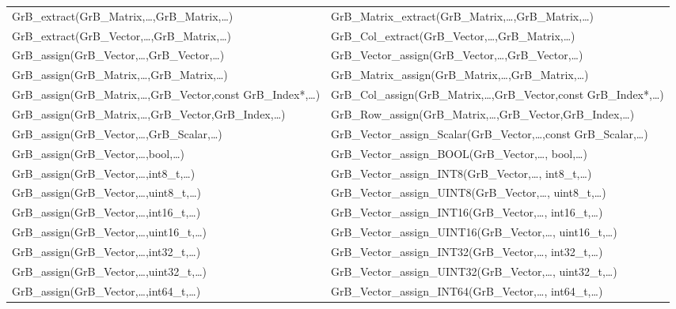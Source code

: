 \begin{table}[htb]
{\begin{tabular}{l|l}
{\sf GrB\_extract(GrB\_Matrix,\ldots,GrB\_Matrix,\ldots)}		& {\sf GrB\_Matrix\_extract(GrB\_Matrix,\ldots,GrB\_Matrix,\ldots)} \\
{\sf GrB\_extract(GrB\_Vector,\ldots,GrB\_Matrix,\ldots)}		& {\sf GrB\_Col\_extract(GrB\_Vector,\ldots,GrB\_Matrix,\ldots)} \\ \hline
{\sf GrB\_assign(GrB\_Vector,\ldots,GrB\_Vector,\ldots)}		& {\sf GrB\_Vector\_assign(GrB\_Vector,\ldots,GrB\_Vector,\ldots)} \\
{\sf GrB\_assign(GrB\_Matrix,\ldots,GrB\_Matrix,\ldots)}		& {\sf GrB\_Matrix\_assign(GrB\_Matrix,\ldots,GrB\_Matrix,\ldots)} \\
{\sf GrB\_assign(GrB\_Matrix,\ldots,GrB\_Vector,const GrB\_Index*,\ldots)}	& {\sf GrB\_Col\_assign(GrB\_Matrix,\ldots,GrB\_Vector,const GrB\_Index*,\ldots)} \\
{\sf GrB\_assign(GrB\_Matrix,\ldots,GrB\_Vector,GrB\_Index,\ldots)}	& {\sf GrB\_Row\_assign(GrB\_Matrix,\ldots,GrB\_Vector,GrB\_Index,\ldots)} \\ 
\hline
{\sf GrB\_assign(GrB\_Vector,\ldots,GrB\_Scalar,\ldots)}	& {\sf GrB\_Vector\_assign\_Scalar(GrB\_Vector,\ldots,const GrB\_Scalar,\ldots)} \\
{\sf GrB\_assign(GrB\_Vector,\ldots,bool,\ldots)}		& {\sf GrB\_Vector\_assign\_BOOL(GrB\_Vector,\ldots, bool,\ldots)} \\
{\sf GrB\_assign(GrB\_Vector,\ldots,int8\_t,\ldots)}		& {\sf GrB\_Vector\_assign\_INT8(GrB\_Vector,\ldots, int8\_t,\ldots)} \\
{\sf GrB\_assign(GrB\_Vector,\ldots,uint8\_t,\ldots)}		& {\sf GrB\_Vector\_assign\_UINT8(GrB\_Vector,\ldots, uint8\_t,\ldots)} \\
{\sf GrB\_assign(GrB\_Vector,\ldots,int16\_t,\ldots)}		& {\sf GrB\_Vector\_assign\_INT16(GrB\_Vector,\ldots, int16\_t,\ldots)} \\
{\sf GrB\_assign(GrB\_Vector,\ldots,uint16\_t,\ldots)}		& {\sf GrB\_Vector\_assign\_UINT16(GrB\_Vector,\ldots, uint16\_t,\ldots)} \\
{\sf GrB\_assign(GrB\_Vector,\ldots,int32\_t,\ldots)}		& {\sf GrB\_Vector\_assign\_INT32(GrB\_Vector,\ldots, int32\_t,\ldots)} \\
{\sf GrB\_assign(GrB\_Vector,\ldots,uint32\_t,\ldots)}		& {\sf GrB\_Vector\_assign\_UINT32(GrB\_Vector,\ldots, uint32\_t,\ldots)} \\
{\sf GrB\_assign(GrB\_Vector,\ldots,int64\_t,\ldots)}		& {\sf GrB\_Vector\_assign\_INT64(GrB\_Vector,\ldots, int64\_t,\ldots)} \\

\end{tabular}}
\end{table}
